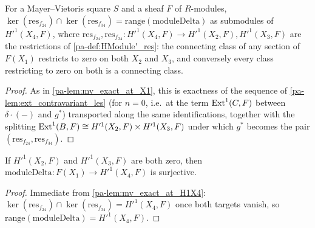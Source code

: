 \begin{lemma}[Exactness at \(H'^1(X_4,F)\)]
  \label{pa-lem:mv_exact_at_H1X4}
  \leanok

  For a Mayer--Vietoris square \(S\) and a sheaf \(F\) of \(R\)-modules,
  \(\ker(\mathrm{res}_{f_{24}}) \cap \ker(\mathrm{res}_{f_{34}}) = \mathrm{range}(\mathrm{moduleDelta})\)
  as submodules of \(H'^1(X_4,F)\), where
  \(\mathrm{res}_{f_{24}}, \mathrm{res}_{f_{34}} : H'^1(X_4,F) \to H'^1(X_2,F), H'^1(X_3,F)\)
  are the restrictions of \ref{pa-def:HModule'_res}: the connecting class of any section of
  \(F(X_1)\) restricts to zero on both \(X_2\) and \(X_3\), and conversely every class
  restricting to zero on both is a connecting class.
\end{lemma}
\begin{proof}
  \leanok
  As in \ref{pa-lem:mv_exact_at_X1}, this is exactness of the sequence of
  \ref{pa-lem:ext_contravariant_les} (for \(n=0\), i.e.\ at the term \(\operatorname{Ext}^1(C,F)\) between
  \(\delta \cdot (-)\) and \(g^*\)) transported along the same identifications, together
  with the splitting \(\operatorname{Ext}^1(B,F) \cong H'^1(X_2,F) \times H'^1(X_3,F)\) under which
  \(g^*\) becomes the pair \((\mathrm{res}_{f_{24}}, \mathrm{res}_{f_{34}})\).
\end{proof}

\begin{theorem}
  \label{pa-thm:moduleDelta_surjective}
  \leanok

  If \(H'^1(X_2,F)\) and \(H'^1(X_3,F)\) are both zero, then
  \(\mathrm{moduleDelta} : F(X_1) \to H'^1(X_4,F)\) is surjective.
\end{theorem}
\begin{proof}
  \leanok
  Immediate from \ref{pa-lem:mv_exact_at_H1X4}:
  \(\ker(\mathrm{res}_{f_{24}}) \cap \ker(\mathrm{res}_{f_{34}}) = H'^1(X_4,F)\) once both
  targets vanish, so \(\mathrm{range}(\mathrm{moduleDelta}) = H'^1(X_4,F)\).
\end{proof}


